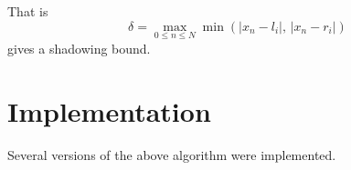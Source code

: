     That is
    $$ \delta = \max_{0 \leq n \leq N} \min(|x_n-l_i|,\, |x_n - r_i|)$$
    gives a shadowing bound.
\section{Implementation}
  Several versions of the above algorithm were implemented.

